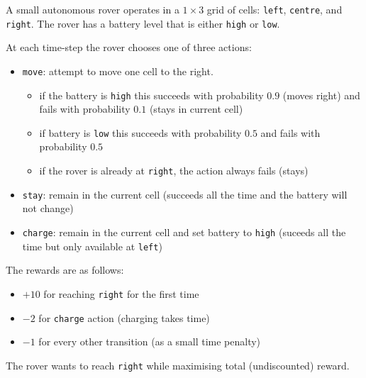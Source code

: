 A small autonomous rover operates in a $1 \times 3$ grid of cells:
\texttt{left}, \texttt{centre}, and \texttt{right}.
The rover has a battery level that is either \texttt{high} or \texttt{low}.

\medskip\noindent
At each time-step the rover chooses one of three actions:
\begin{itemize}
  \item \texttt{move}: attempt to move one cell to the right.
    \begin{itemize}
      \item if the battery is \texttt{high} this succeeds with probability $0.9$ (moves right) and
            fails with probability $0.1$ (stays in current cell)
      \item if battery is \texttt{low} this succeeds with probability $0.5$ and
            fails with probability $0.5$
      \item if the rover is already at \texttt{right}, the action always fails (stays)
    \end{itemize}
  \item \texttt{stay}: remain in the current cell (succeeds all the time and the battery will not change)
  \item \texttt{charge}: remain in the current cell and set battery to \texttt{high}
        (suceeds all the time but only available at \texttt{left})
\end{itemize}
\medskip\noindent
The rewards are as follows:
\begin{itemize}
  \item $+10$ for reaching \texttt{right} for the first time
  \item $-2$ for \texttt{charge} action (charging takes time)
  \item $-1$ for every other transition (as a small time penalty)
\end{itemize}

\medskip\noindent
The rover wants to reach \texttt{right} while maximising total (undiscounted) reward.


